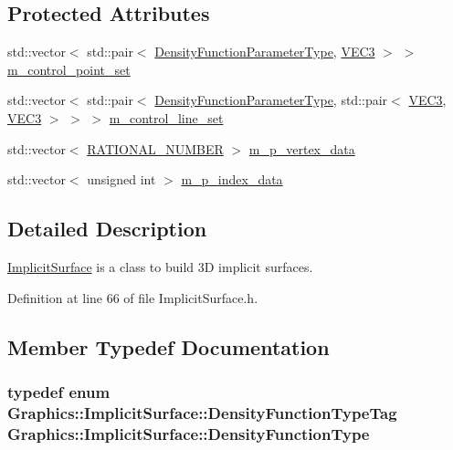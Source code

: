 \subsection*{Protected Attributes}
\begin{DoxyCompactItemize}
\item 
std::vector$<$ std::pair$<$ \hyperlink{class_graphics_1_1_implicit_surface_1_1_density_function_parameter_type}{DensityFunctionParameterType}, \hyperlink{class_math_1_1_vec3}{VEC3} $>$ $>$ \hyperlink{class_graphics_1_1_implicit_surface_a095239fc5e7e142a54dd647af02f5bd3}{m\_\-control\_\-point\_\-set}
\item 
std::vector$<$ std::pair$<$ \hyperlink{class_graphics_1_1_implicit_surface_1_1_density_function_parameter_type}{DensityFunctionParameterType}, std::pair$<$ \hyperlink{class_math_1_1_vec3}{VEC3}, \hyperlink{class_math_1_1_vec3}{VEC3} $>$ $>$ $>$ \hyperlink{class_graphics_1_1_implicit_surface_aaeffaeceffec750caaad43b0b3d93e58}{m\_\-control\_\-line\_\-set}
\item 
std::vector$<$ \hyperlink{namespace_utilities_a40969b96bd8d847b962e297cb79f08ce}{RATIONAL\_\-NUMBER} $>$ \hyperlink{class_graphics_1_1_implicit_surface_a765fc907fac987217a58b070e82c9003}{m\_\-p\_\-vertex\_\-data}
\item 
std::vector$<$ unsigned int $>$ \hyperlink{class_graphics_1_1_implicit_surface_ad1710ec993307578fbf7a1aa9c4fc9ae}{m\_\-p\_\-index\_\-data}
\end{DoxyCompactItemize}


\subsection{Detailed Description}
\hyperlink{class_graphics_1_1_implicit_surface}{ImplicitSurface} is a class to build 3D implicit surfaces. 

Definition at line 66 of file ImplicitSurface.h.



\subsection{Member Typedef Documentation}
\hypertarget{class_graphics_1_1_implicit_surface_ab19cb1eb5b21daefd95b6d007be5c199}{
\subsubsection[{DensityFunctionType}]{\setlength{\rightskip}{0pt plus 5cm}typedef enum {\bf Graphics::ImplicitSurface::DensityFunctionTypeTag}  {\bf Graphics::ImplicitSurface::DensityFunctionType}}}
\label{class_graphics_1_1_implicit_surface_ab19cb1eb5b21daefd95b6d007be5c199}


